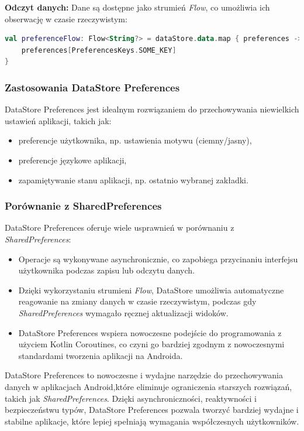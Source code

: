 \documentclass[12pt]{article}
\begin{document}
\noindent \textbf{Odczyt danych:} Dane są dostępne jako strumień \textit{Flow}, co umożliwia ich obserwację w czasie rzeczywistym:
\begin{lstlisting}[language=Kotlin]
val preferenceFlow: Flow<String?> = dataStore.data.map { preferences ->
    preferences[PreferencesKeys.SOME_KEY]
}
\end{lstlisting}

\subsubsection*{Zastosowania DataStore Preferences}
\noindent DataStore Preferences jest idealnym rozwiązaniem do przechowywania niewielkich ustawień aplikacji, takich jak:
\begin{itemize}
    \item preferencje użytkownika, np. ustawienia motywu (ciemny/jasny),
    \item preferencje językowe aplikacji,
    \item zapamiętywanie stanu aplikacji, np. ostatnio wybranej zakładki.
\end{itemize}

\subsubsection*{Porównanie z SharedPreferences}
\noindent DataStore Preferences oferuje wiele usprawnień w porównaniu z \textit{SharedPreferences}:
\begin{itemize}
    \item Operacje są wykonywane asynchronicznie, co zapobiega przycinaniu interfejsu użytkownika podczas zapisu lub odczytu danych.
    \item Dzięki wykorzystaniu strumieni \textit{Flow}, DataStore umożliwia automatyczne reagowanie na zmiany danych w czasie rzeczywistym, podczas gdy \textit{SharedPreferences} wymagało ręcznej aktualizacji widoków.
    \item DataStore Preferences wspiera nowoczesne podejście do programowania z użyciem Kotlin Coroutines, co czyni go bardziej zgodnym z nowoczesnymi standardami tworzenia aplikacji na Androida.
\end{itemize}
DataStore Preferences to nowoczesne i wydajne narzędzie do przechowywania danych w aplikacjach Android,które eliminuje ograniczenia starszych rozwiązań,
takich jak \textit{SharedPreferences}. Dzięki asynchroniczności, reaktywności i bezpieczeństwu typów, DataStore Preferences pozwala tworzyć bardziej wydajne
i stabilne aplikacje, które lepiej spełniają wymagania współczesnych użytkowników.
\end{document}
